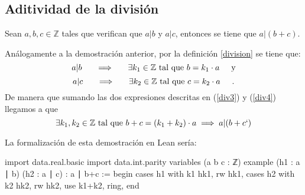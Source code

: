 \subsection{Aditividad de la división}
\begin{teorema}
	Sean \(a, b, c \in \mathbb{Z}\) tales que verifican que \(a|b\) y \(a|c\), entonces se tiene que \(a|(b+c)\).
\end{teorema}
\begin{demostracion}
	Análogamente a la demostración anterior, por la definición \ref{division} se tiene que:
	\begin{equation}\label{div3}
	a|b \hspace{0.5cm} \implies \hspace{0.5cm}\exists k_1 \in \mathbb{Z} \ \text{tal que }b=k_1 \cdot a \hspace{0.5cm} \text{y}
	\end{equation}
	\begin{equation}\label{div4}
	a|c \hspace{0.5cm} \implies \hspace{0.5cm}\exists k_2 \in \mathbb{Z} \ \text{tal que }c=k_2 \cdot a \hspace{0.5cm}.
	\end{equation}
	De manera que sumando las dos expresiones descritas en (\ref{div3}) y (\ref{div4}) llegamos a que
	\begin{equation*}
	\exists k_1, k_2 \in \mathbb{Z} \ \text{tal que }b+c=(k_1+k_2)\cdot a \implies a | (b+c`)
	\end{equation*}
\end{demostracion}

La formalización de esta demostración en Lean sería:
\begin{leancode}
import data.real.basic
import data.int.parity
variables (a b c : ℤ)
example (h1 : a ∣ b) (h2 : a ∣ c) : a ∣ b+c :=
begin
cases h1 with k1 hk1,
rw hk1,
cases h2 with k2 hk2,
rw hk2,
use k1+k2,
ring,
end
\end{leancode}